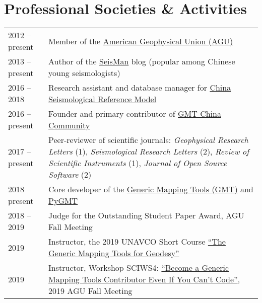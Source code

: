 \section*{Professional Societies \& Activities}

\newcommand{\tabitem}{~~\llap{\textbullet}~~}

\begin{tabular}{p{} p{}}
2012 -- present & Member of the \href{https://sites.agu.org/}{American Geophysical Union (AGU)} \\
2013 -- present & Author of the \href{https://blog.seisman.info}{SeisMan} blog (popular among Chinese young seismologists) \\
2016 -- 2018    & Research assistant and database manager for \href{http://chinageorefmodel.org/}{China Seismological Reference Model} \\
2016 -- present & Founder and primary contributor of \href{http://gmt-china.org/}{GMT China Community} \\
2017 -- present & Peer-reviewer of scientific journals:
                  \textit{Geophysical Research Letters} (1),
                  \textit{Seismological Research Letters} (2),
                  \textit{Review of Scientific Instruments} (1),
                  \textit{Journal of Open Source Software} (2) \\
2018 -- present & Core developer of the \href{https://github.com/GenericMappingTools/gmt}{Generic Mapping Tools (GMT)} and \href{https://github.com/GenericMappingTools/pygmt}{PyGMT} \\
2018 -- 2019 & Judge for the Outstanding Student Paper Award, AGU Fall Meeting \\
2019 & Instructor, the 2019 UNAVCO Short Course \href{https://www.unavco.org/education/professional-development/short-courses/2019/geodetic-gmt/geodetic-gmt.html}{``The Generic Mapping Tools for Geodesy''} \\
2019 & Instructor, Workshop SCIWS4: \href{https://www.agu.org/Events/SCIWS4-Generic-Mapping-Tools}{``Become a Generic Mapping Tools Contributor Even If You Can't Code''}, 2019 AGU Fall Meeting \\
\end{tabular}
